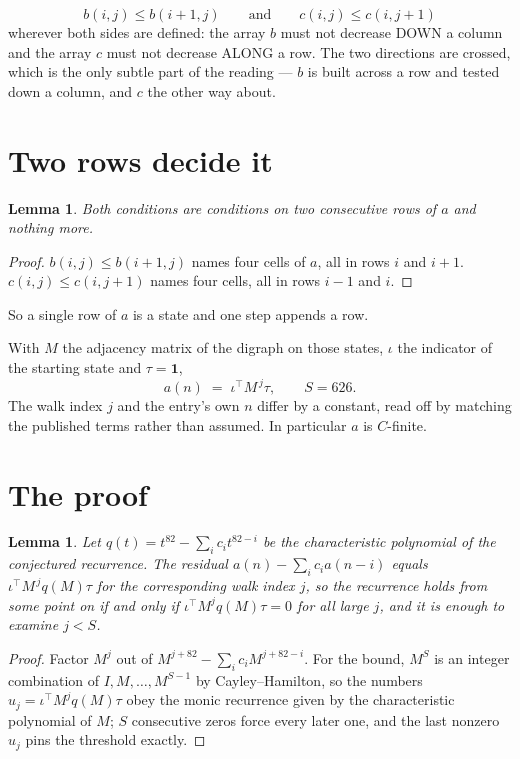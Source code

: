 \documentclass[11pt,a4paper]{article}
\theoremstyle{plain}
\newtheorem{lemma}[theorem]{Lemma}
\theoremstyle{definition}
\begin{document}
\[
b(i,j)\le b(i{+}1,j)\qquad\text{and}\qquad c(i,j)\le c(i,j{+}1)
\]
wherever both sides are defined: the array $b$ must not decrease DOWN a column and the array
$c$ must not decrease ALONG a row. The two directions are crossed, which is the only subtle
part of the reading --- $b$ is built across a row and tested down a column, and $c$ the other
way about.


\section{Two rows decide it}

\begin{lemma}\label{lem:win}
Both conditions are conditions on two consecutive rows of $a$ and nothing more.
\end{lemma}

\begin{proof}
$b(i,j)\le b(i{+}1,j)$ names four cells of $a$, all in rows $i$ and $i+1$. $c(i,j)\le
c(i,j{+}1)$ names four cells, all in rows $i-1$ and $i$.
\end{proof}

So a single row of $a$ is a state and one step appends a row.

With $M$ the adjacency matrix of the digraph on those states, $\iota$ the indicator of the
starting state and $\tau=\mathbf{1}$,
\[
a(n)\;=\;\iota^{\!\top}M^{\,j}\tau ,\qquad S=626.
\]
The walk index $j$ and the entry's own $n$ differ by a constant, read off by matching the
published terms rather than assumed. In particular $a$ is $C$-finite.

\section{The proof}

\begin{lemma}\label{lem:crit}
Let $q(t)=t^{82}-\sum_i c_it^{82-i}$ be the characteristic polynomial of the
conjectured recurrence. The residual $a(n)-\sum_ic_ia(n-i)$ equals
$\iota^{\!\top}M^{\,j}q(M)\tau$ for the corresponding walk index $j$, so the recurrence
holds from some point on if and only if $\iota^{\!\top}M^{j}q(M)\tau=0$ for all large $j$,
and it is enough to examine $j<S$.
\end{lemma}

\begin{proof}
Factor $M^{j}$ out of $M^{j+82}-\sum_ic_iM^{j+82-i}$. For the bound, $M^{S}$
is an integer combination of $I,M,\dots,M^{S-1}$ by Cayley--Hamilton, so the numbers
$u_j=\iota^{\!\top}M^{j}q(M)\tau$ obey the monic recurrence given by the characteristic
polynomial of $M$; $S$ consecutive zeros force every later one, and the last nonzero $u_j$
pins the threshold exactly.
\end{proof}
\end{document}
